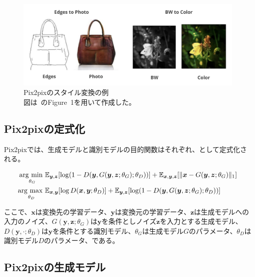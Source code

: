 \begin{figure}[b]
\centering
\includegraphics[width=0.8\columnwidth]{figure/pix2pix_img.png}
\caption[Pix2pixのスタイル変換の例]{Pix2pixのスタイル変換の例\\
図は~\cite{pix2pix}のFigure~1を用いて作成した。}
\label{fig:pix2pix_img}
\end{figure}

\clearpage

\subsection{Pix2pixの定式化}

Pix2pixでは、生成モデルと識別モデルの目的関数はそれぞれ、として定式化される。

\begin{align}
    \label{eq:pix2pix_G}
    \mathop{\mathrm{arg~min~}}\limits _{\theta_G}& \mathbb{E}_{\boldsymbol{y}, \boldsymbol{z}}[\log (1-D(\boldsymbol{y}, G(\boldsymbol{y}, \boldsymbol{z}; \theta_G); \theta_D))]+\mathbb{E}_{\boldsymbol{x}, \boldsymbol{y}, \boldsymbol{z}}[\|\boldsymbol{x}-G(\boldsymbol{y}, \boldsymbol{z}; \theta_G)\|_{1}]\\
    \label{eq:pix2pix_D}
    \mathop{\mathrm{arg~max~}}\limits _{\theta_D}& \mathbb{E}_{\boldsymbol{x}, \boldsymbol{y}}[\log D(\boldsymbol{x}, \boldsymbol{y}; \theta_D)]+\mathbb{E}_{\boldsymbol{y}, \boldsymbol{z}}[\log (1-D(\boldsymbol{y}, G(\boldsymbol{y}, \boldsymbol{z}; \theta_G); \theta_D))]
\end{align}

ここで、$\boldsymbol{x}$は変換先の学習データ、$\boldsymbol{y}$は変換元の学習データ、$\boldsymbol{z}$は生成モデルへの入力のノイズ、$G(\boldsymbol{y},\boldsymbol{z};\theta_G)$は$\boldsymbol{y}$を条件としノイズ$\boldsymbol{z}$を入力とする生成モデル、$D(\boldsymbol{y},\cdot;\theta_D)$は$\boldsymbol{y}$を条件とする識別モデル、$\theta_G$は生成モデル$G$のパラメータ、$\theta_D$は識別モデル$D$のパラメータ、である。

\subsection{Pix2pixの生成モデル}

